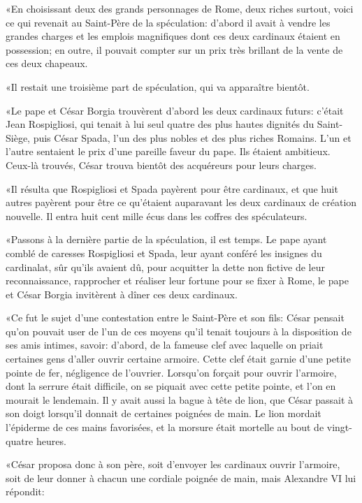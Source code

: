 «En choisissant deux des grands personnages de Rome, deux riches surtout, voici ce qui revenait au Saint-Père de la spéculation: d'abord il avait à vendre les grandes charges et les emplois magnifiques dont ces deux cardinaux étaient en possession; en outre, il pouvait compter sur un prix très brillant de la vente de ces deux chapeaux.

«Il restait une troisième part de spéculation, qui va apparaître bientôt.

«Le pape et César Borgia trouvèrent d'abord les deux cardinaux futurs: c'était Jean Rospigliosi, qui tenait à lui seul quatre des plus hautes dignités du Saint-Siège, puis César Spada, l'un des plus nobles et des plus riches Romains. L'un et l'autre sentaient le prix d'une pareille faveur du pape. Ils étaient ambitieux. Ceux-là trouvés, César trouva bientôt des acquéreurs pour leurs charges.

«Il résulta que Rospigliosi et Spada payèrent pour être cardinaux, et que huit autres payèrent pour être ce qu'étaient auparavant les deux cardinaux de création nouvelle. Il entra huit cent mille écus dans les coffres des spéculateurs.

«Passons à la dernière partie de la spéculation, il est temps. Le pape ayant comblé de caresses Rospigliosi et Spada, leur ayant conféré les insignes du cardinalat, sûr qu'ils avaient dû, pour acquitter la dette non fictive de leur reconnaissance, rapprocher et réaliser leur fortune pour se fixer à Rome, le pape et César Borgia invitèrent à dîner ces deux cardinaux.

«Ce fut le sujet d'une contestation entre le Saint-Père et son fils: César pensait qu'on pouvait user de l'un de ces moyens qu'il tenait toujours à la disposition de ses amis intimes, savoir: d'abord, de la fameuse clef avec laquelle on priait certaines gens d'aller ouvrir certaine armoire. Cette clef était garnie d'une petite pointe de fer, négligence de l'ouvrier. Lorsqu'on forçait pour ouvrir l'armoire, dont la serrure était difficile, on se piquait avec cette petite pointe, et l'on en mourait le lendemain. Il y avait aussi la bague à tête de lion, que César passait à son doigt lorsqu'il donnait de certaines poignées de main. Le lion mordait l'épiderme de ces mains favorisées, et la morsure était mortelle au bout de vingt-quatre heures.

«César proposa donc à son père, soit d'envoyer les cardinaux ouvrir l'armoire, soit de leur donner à chacun une cordiale poignée de main, mais Alexandre VI lui répondit:

